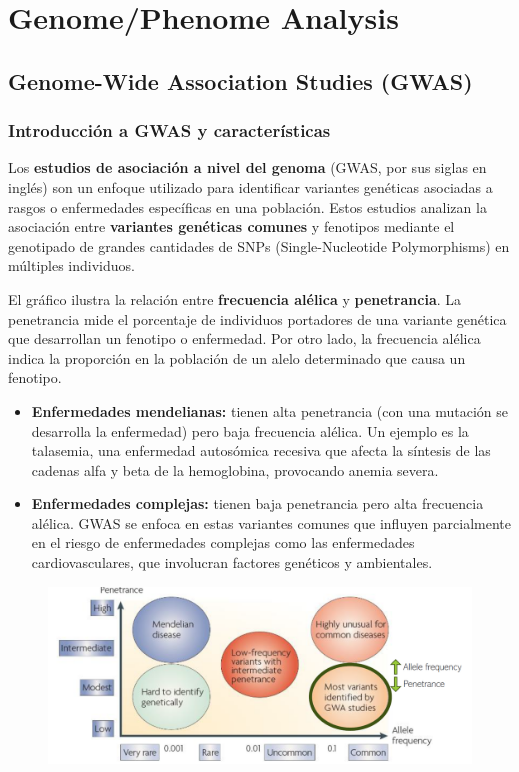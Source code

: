 \part{Genome/Phenome Analysis}
\chapter{Genome-Wide Association Studies (GWAS)}
\section{Introducción a GWAS y características}
Los \textbf{estudios de asociación a nivel del genoma} (GWAS, por sus siglas en inglés) son un enfoque utilizado para identificar variantes genéticas asociadas a rasgos o enfermedades específicas en una población. Estos estudios analizan la asociación entre \textbf{variantes genéticas comunes} y fenotipos mediante el genotipado de grandes cantidades de SNPs (Single-Nucleotide Polymorphisms) en múltiples individuos.

El gráfico ilustra la relación entre \textbf{frecuencia alélica} y \textbf{penetrancia}. La penetrancia mide el porcentaje de individuos portadores de una variante genética que desarrollan un fenotipo o enfermedad. Por otro lado, la frecuencia alélica indica la proporción en la población de un alelo determinado que causa un fenotipo.
\begin{itemize}
\item \textbf{Enfermedades mendelianas:} tienen alta penetrancia (con una mutación se desarrolla la enfermedad) pero baja frecuencia alélica. Un ejemplo es la talasemia, una enfermedad autosómica recesiva que afecta la síntesis de las cadenas alfa y beta de la hemoglobina, provocando anemia severa.
\item \textbf{Enfermedades complejas:} tienen baja penetrancia pero alta frecuencia alélica. GWAS se enfoca en estas variantes comunes que influyen parcialmente en el riesgo de enfermedades complejas como las enfermedades cardiovasculares, que involucran factores genéticos y ambientales.
\end{itemize}

\begin{figure}[htbp]
\centering
\includegraphics[width = \textwidth]{figs/gwas.png}
\end{figure}

